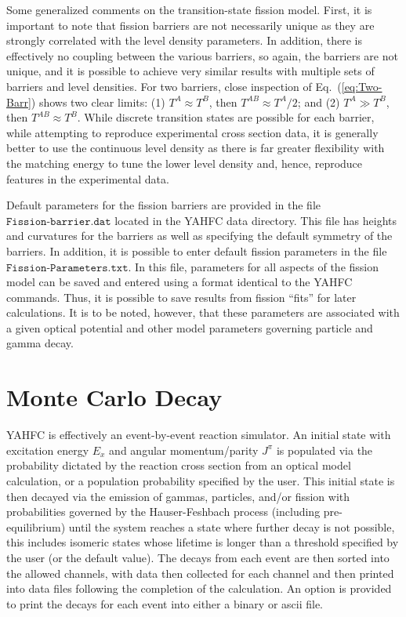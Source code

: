\documentclass[
10pt,
showpacs,preprintnumbers,footinbib,
amsfonts,amsmath,amssymb,
aps,
prc,twocolumn,groupedaddress,superscriptaddress,
showkeys,
nofootinbib
]{revtex4-1}
\begin{document}
Some generalized comments on the transition-state fission model. First, it is important to note that fission barriers are not necessarily unique as they are strongly correlated with the level density parameters. In addition, there is effectively no coupling between the various barriers, so again, the barriers are not unique, and it is possible to achieve very similar results with multiple sets of barriers and level densities. For two barriers, close inspection of Eq.~(\ref{eq:Two-Barr}) shows two clear limits: (1) $T^A \approx T^B$, then $T^{AB} \approx T^A/2$; and (2) $T^A \gg T^B$, then $T^{AB} \approx T^B$. While discrete transition states are possible for each barrier, while attempting to reproduce experimental cross section data, it is generally better to use the continuous level density as there is far greater flexibility with the matching energy to tune the lower level density and, hence, reproduce features in the experimental data.

Default parameters for the fission barriers are provided in the file ${\texttt{Fission-barrier.dat}}$ located in the YAHFC data directory. This file has heights and curvatures for the barriers as well as specifying the default symmetry of the barriers. In addition, it is possible to enter default fission parameters in the file ${\texttt{Fission-Parameters.txt}}$. In this file, parameters for all aspects of the fission model can be saved and entered using a format identical to the YAHFC commands. Thus, it is possible to save results from fission ``fits'' for later calculations. It is to be noted, however, that these parameters are associated with a given optical potential and other model parameters governing particle and gamma decay.

\section{Monte Carlo Decay}

YAHFC is effectively an event-by-event reaction simulator. An initial state with excitation energy $E_x$ and angular momentum/parity $J^\pi$ is populated via the probability dictated by the reaction cross section from an optical model calculation, or a population probability specified by the user. This initial state is then decayed via the emission of gammas, particles, and/or fission with probabilities governed by the Hauser-Feshbach process (including pre-equilibrium) until the system reaches a state where further decay is not possible, this includes isomeric states whose lifetime is longer than a threshold specified by the user (or the default value). The decays from each event are then sorted into the allowed channels, with data then collected for each channel and then printed into data files following the completion of the calculation. An option is provided to print the decays for each event into either a binary or ascii file.  
\end{document}
